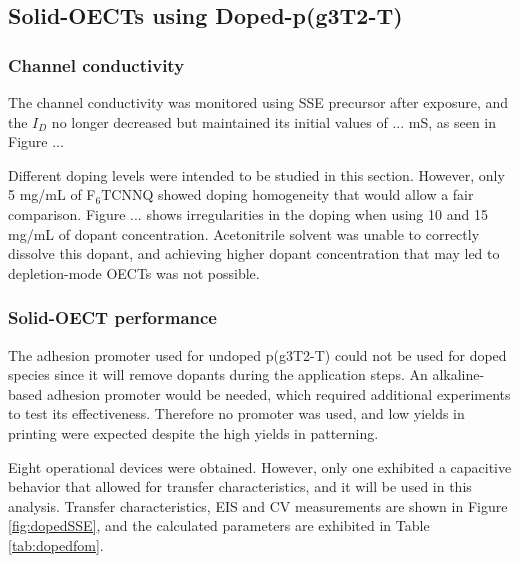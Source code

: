 \subsection{Solid-OECTs using Doped-p(g3T2-T)} \label{dopedOECTs}

\subsubsection{Channel conductivity}
The channel conductivity was monitored using SSE precursor after exposure, and the $I_{D}$ no longer decreased but maintained its initial values of ... mS, as seen in Figure ...

Different doping levels were intended to be studied in this section. However, only 5 mg/mL of F$_{6}$TCNNQ showed doping homogeneity that would allow a fair comparison. Figure ... shows irregularities in the doping when using 10 and 15 mg/mL of dopant concentration. Acetonitrile solvent was unable to correctly dissolve this dopant, and achieving higher dopant concentration that may led to depletion-mode OECTs was not possible.

\subsubsection{Solid-OECT performance}

The adhesion promoter used for undoped p(g3T2-T) could not be used for doped species since it will remove dopants during the application steps. An alkaline-based adhesion promoter would be needed, which required additional experiments to test its effectiveness. Therefore no promoter was used, and low yields in printing were expected despite the high yields in patterning.

Eight operational devices were obtained. However, only one exhibited a capacitive behavior that allowed for transfer characteristics, and it will be used in this analysis. Transfer characteristics, EIS and CV measurements are shown in Figure \ref{fig:dopedSSE}, and the calculated parameters are exhibited in Table \ref{tab:dopedfom}.

